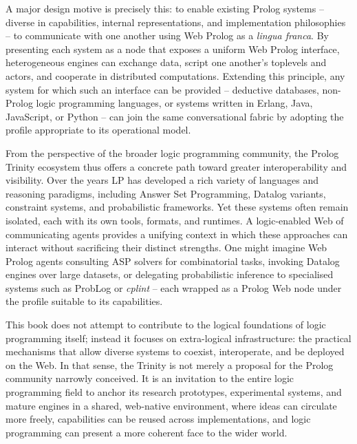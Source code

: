 A major design motive is precisely this: to enable existing Prolog systems -- diverse in capabilities, internal representations, and implementation philosophies -- to communicate with one another using Web Prolog as a \textit{lingua franca}. By presenting each system as a node that exposes a uniform Web Prolog interface, heterogeneous engines can exchange data, script one another's toplevels and actors, and cooperate in distributed computations. Extending this principle, any system for which such an interface can be provided -- deductive databases, non-Prolog logic programming languages, or systems written in Erlang, Java, JavaScript, or Python -- can join the same conversational fabric by adopting the profile appropriate to its operational model.

From the perspective of the broader logic programming community, the Prolog Trinity ecosystem thus offers a concrete path toward greater interoperability and visibility. Over the years LP has developed a rich variety of languages and reasoning paradigms, including Answer Set Programming, Datalog variants, constraint systems, and probabilistic frameworks. Yet these systems often remain isolated, each with its own tools, formats, and runtimes. A logic-enabled Web of communicating agents provides a unifying context in which these approaches can interact without sacrificing their distinct strengths. One might imagine Web Prolog agents consulting ASP solvers for combinatorial tasks, invoking Datalog engines over large datasets, or delegating probabilistic inference to specialised systems such as ProbLog or \textit{cplint} -- each wrapped as a Prolog Web node under the profile suitable to its capabilities.

This book does not attempt to contribute to the logical foundations of logic programming itself; instead it focuses on extra-logical infrastructure: the practical mechanisms that allow diverse systems to coexist, interoperate, and be deployed on the Web. In that sense, the Trinity is not merely a proposal for the Prolog community narrowly conceived. It is an invitation to the entire logic programming field to anchor its research prototypes, experimental systems, and mature engines in a shared, web-native environment, where ideas can circulate more freely, capabilities can be reused across implementations, and logic programming can present a more coherent face to the wider world.



